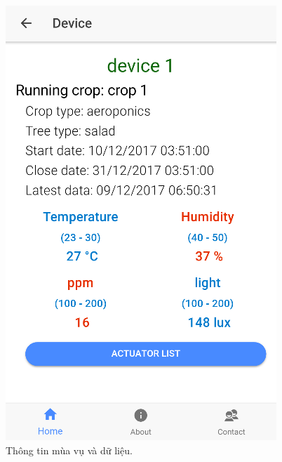 \documentclass[a4paper,12pt,oneside]{article}
\begin{document}
\begin{figure}[H]
\begin{center}
\includegraphics[scale=.7]{hinh/mobile_crop.png}
\end{center}
\caption{Thông tin mùa vụ và dữ liệu.}
\end{figure}
\end{document}
